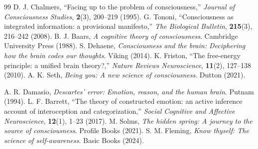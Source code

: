\documentclass[12pt,a4paper]{article}
\begin{document}
\begin{thebibliography}{99}
			 D. J. Chalmers, ``Facing up to the problem of consciousness,'' \emph{Journal of Consciousness Studies}, \textbf{2}(3), 200--219 (1995).
			 G. Tononi, ``Consciousness as integrated information: a provisional manifesto,'' \emph{The Biological Bulletin}, \textbf{215}(3), 216--242 (2008).
			 B. J. Baars, \emph{A cognitive theory of consciousness}. Cambridge University Press (1988).
			 S. Dehaene, \emph{Consciousness and the brain: Deciphering how the brain codes our thoughts}. Viking (2014).
			 K. Friston, ``The free-energy principle: a unified brain theory?,'' \emph{Nature Reviews Neuroscience}, \textbf{11}(2), 127--138 (2010).
			 A. K. Seth, \emph{Being you: A new science of consciousness}. Dutton (2021).
			
			 A. R. Damasio, \emph{Descartes' error: Emotion, reason, and the human brain}. Putnam (1994).
			 L. F. Barrett, ``The theory of constructed emotion: an active inference account of interoception and categorization,'' \emph{Social Cognitive and Affective Neuroscience}, \textbf{12}(1), 1--23 (2017).
			 M. Solms, \emph{The hidden spring: A journey to the source of consciousness}. Profile Books (2021).
			 S. M. Fleming, \emph{Know thyself: The science of self-awareness}. Basic Books (2024).
			

\end{thebibliography}
\end{document}
